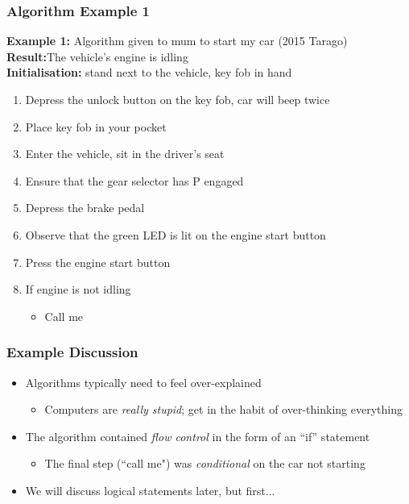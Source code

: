 \documentclass[14pt]{beamer}
\begin{document}
\begin{frame}[fragile] %

\frametitle{Algorithm Example 1}
{\footnotesize
\textbf{Example 1:} Algorithm given to mum to start my car (2015 Tarago) \\
\textbf{Result:}{The vehicle's engine is idling} \\
\textbf{Initialisation:} stand next to the vehicle, key fob in hand 
\begin{enumerate}
\setlength{\itemsep}{1pt}
  \setlength{\parskip}{0pt}
  \setlength{\parsep}{0pt}
\item Depress the unlock button on the key fob, car will beep twice
\item Place key fob in your pocket
\item Enter the vehicle, sit in the driver's seat
\item Ensure that the gear selector has P engaged
\item Depress the brake pedal
\item Observe that the green LED is lit on the engine start button
\item Press the engine start button
\item If engine is not idling
	\begin{itemize}
		\item Call me
	\end{itemize}
\end{enumerate}
}
\end{frame}

\begin{frame} %
\frametitle{Example Discussion}
\begin{itemize}
\item Algorithms typically need to feel over-explained
	\begin{itemize}
		\item Computers are \textit{really stupid}; get in the habit of over-thinking everything
	\end{itemize}
\item The algorithm contained \textit{flow control} in the form of an ``if'' statement
	\begin{itemize}
		\item The final step (``call me") was \textit{conditional} on the car not starting
	\end{itemize}
\item We will discuss logical statements later, but first...
\end{itemize}
\end{frame}
\end{document}
